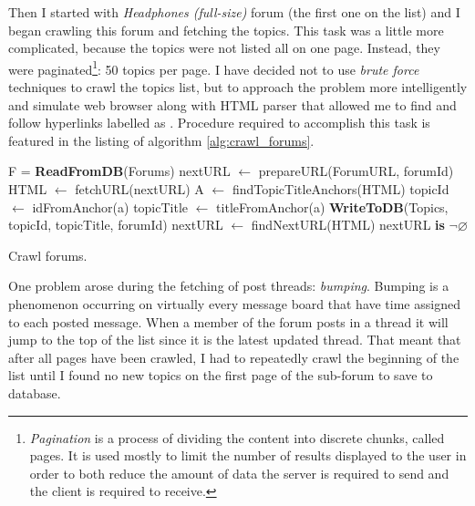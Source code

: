     Then I started with \emph{Headphones (full-size)} forum (the first one on the list) and I began crawling this forum and fetching the topics. This task was a little more complicated, because the topics were not listed all on one page. Instead, they were paginated\footnote{\emph{Pagination} is a process of dividing the content into discrete chunks, called pages. It is used mostly to limit the number of results displayed to the user in order to both reduce the amount of data the server is required to send and the client is required to receive.}: 50 topics per page. I have decided not to use \emph{brute force} techniques to crawl the topics list, but to approach the problem more intelligently and simulate web browser along with HTML parser that allowed me to find and follow hyperlinks labelled as . Procedure required to accomplish this task is featured in the listing of algorithm \ref{alg:crawl_forums}.
  
    \begin{algorithm}[H]
      \begin{algorithmic}[1]
          \State F = \textbf{ReadFromDB}(Forums) 
            \State nextURL $\gets$ prepareURL(ForumURL, forumId)
            \Repeat
              \State HTML $\gets$ fetchURL(nextURL)
              \State A $\gets$ findTopicTitleAnchors(HTML)
                \State topicId $\gets$ idFromAnchor(a)
                \State topicTitle $\gets$ titleFromAnchor(a)
                \State \textbf{WriteToDB}(Topics, topicId, topicTitle, forumId)
              \EndFor
              \State nextURL $\gets$ findNextURL(HTML) 
            \Until nextURL \textbf{is} $\neg\varnothing$
          \EndFor
        \EndProcedure
      \end{algorithmic}
      \caption{Crawl forums.}
      \label{alg:crawl_forums}
    \end{algorithm}
    
    One problem arose during the fetching of post threads: \emph{bumping}. Bumping is a phenomenon occurring on virtually every message board that have time assigned to each posted message. When a member of the forum posts in a thread it will jump to the top of the list since it is the latest updated thread. That meant that after all pages have been crawled, I had to repeatedly crawl the beginning of the list until I found no new topics on the first page of the sub-forum to save to database.
    

